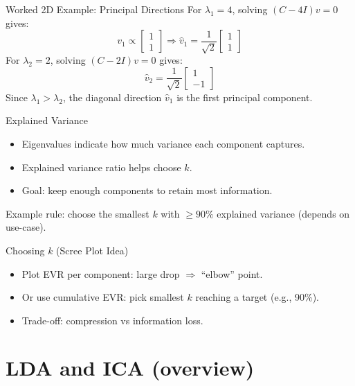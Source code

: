 \documentclass[aspectratio=169]{beamer}
\begin{document}
\begin{frame}{Worked 2D Example: Principal Directions}
  For $\lambda_1=4$, solving $(C-4I)v=0$ gives:
  \[
    v_1 \propto
    \begin{bmatrix}
      1\\1
    \end{bmatrix}
    \Rightarrow
    \hat v_1 = \frac{1}{\sqrt{2}}
    \begin{bmatrix}
      1\\1
    \end{bmatrix}
  \]
  For $\lambda_2=2$, solving $(C-2I)v=0$ gives:
  \[
    \hat v_2 = \frac{1}{\sqrt{2}}
    \begin{bmatrix}
      1\\-1
    \end{bmatrix}
  \]
  \vspace{0.3em}
  \small Since $\lambda_1 > \lambda_2$, the diagonal direction $\hat v_1$ is the first principal component.
\end{frame}

\begin{frame}{Explained Variance}
  \begin{itemize}[<+->]
    \item Eigenvalues indicate how much variance each component captures.
    \item Explained variance ratio helps choose $k$.
    \item Goal: keep enough components to retain most information.
  \end{itemize}
  \vspace{0.4em}
  Example rule: choose the smallest $k$ with $\ge 90\%$ explained variance (depends on use-case).
\end{frame}

\begin{frame}{Choosing $k$ (Scree Plot Idea)}
  \begin{itemize}[<+->]
    \item Plot EVR per component: large drop $\Rightarrow$ ``elbow'' point.
    \item Or use cumulative EVR: pick smallest $k$ reaching a target (e.g., 90\%).
    \item Trade-off: compression vs information loss.
  \end{itemize}
\end{frame}

\section{LDA and ICA (overview)}
\label{sec:ldaica}
\end{document}
